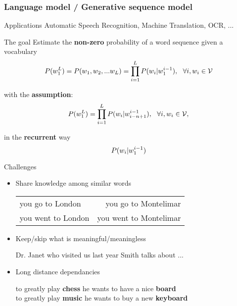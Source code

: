 \begin{frame}
  \frametitle{Language model / Generative sequence model}
  \begin{block}{Applications}
    Automatic Speech Recognition, Machine Translation, OCR, ... 
  \end{block}

  \begin{block}{The goal}
    Estimate the \textbf{non-zero} probability of a word sequence given a vocabulary 
    $$
    P({{w}_{1}^{L}}) = P({w}_1, {w}_2, ... {w}_L) = \prod_{i=1}^L P({w}_i | {{w}_{1}^{i-1}}),\ \ \forall i , {w}_i \in {\mathcal{V}}
    $$

    with the \textbf{\ngram assumption}:
    $$
    P({{w}_{1}^{L}}) = \prod_{i=1}^L P({w}_i | {{w}_{i-n+1}^{i-1}}),\ \ \forall i , {w}_i \in {\mathcal{V}},
    $$

    in the \textbf{recurrent} way 
    $$ P({w}_i | {{w}_{1}^{i-1}})$$
  \end{block}
\end{frame}


\begin{frame}{Challenges}
  \begin{itemize}
  \item Share knowledge among similar words
    \begin{center}
      \begin{tabular}{l|r}
        you {\color{red}go} to {\color{green}London} &you go to {\color{blue}Montelimar}\\
        you {\color{red}went} to {\color{green}London} &you went to {\color{blue}Montelimar}
      \end{tabular}
    \end{center}
  \item Keep/skip what is meaningful/meaningless
    \begin{center}
      Dr. Janet who visited us last year Smith talks about ...
    \end{center}
  \item Long distance dependancies
    \begin{center}
      to greatly play \textbf{chess} he wants to  have a nice \textbf{board}\\
      to greatly play \textbf{music} he wants to buy a new  \textbf{keyboard}
    \end{center}
  \end{itemize}
\end{frame}


